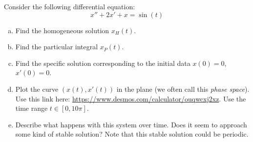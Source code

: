 \documentclass[12pt]{article} %
\begin{document}
\begin{problem}
Consider the following differential equation:
\[
x''+2x'+x=\sin(t)
\]
\begin{enumerate}[(a)]
    \item Find the homogeneous solution $x_H(t)$.
    \item Find the particular integral $x_P(t)$.
    \item Find the specific solution corresponding to the initial data $x(0)=0$, $x'(0)=0$.
    \item Plot the curve $(x(t),x'(t))$ in the plane (we often call this \emph{phase space}). Use this link here: \url{https://www.desmos.com/calculator/ouqwcxj2xz}. Use the time range $t\in [0,10\pi]$.
    \item Describe what happens with this system over time. Does it seem to approach some kind of stable solution? Note that this stable solution could be periodic.
\end{enumerate}
\end{problem}
\end{document}
